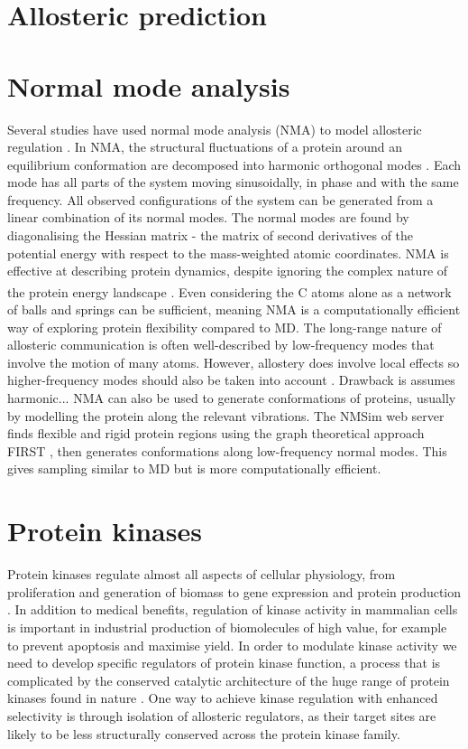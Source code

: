 \section{Allosteric prediction}


\section{Normal mode analysis}

Several studies have used normal mode analysis (NMA) to model allosteric regulation \cite{Mitternacht2011, Panjkovich2012, Balabin2009, Rodgers2013, Zheng2007}.
In NMA, the structural fluctuations of a protein around an equilibrium conformation are decomposed into harmonic orthogonal modes \cite{Hayward2008}.
Each mode has all parts of the system moving sinusoidally, in phase and with the same frequency.
All observed configurations of the system can be generated from a linear combination of its normal modes.
The normal modes are found by diagonalising the Hessian matrix - the matrix of second derivatives of the potential energy with respect to the mass-weighted atomic coordinates.
NMA is effective at describing protein dynamics, despite ignoring the complex nature of the protein energy landscape \cite{Bahar2005}.
Even considering the C\textsuperscript{\textalpha} atoms alone as a network of balls and springs can be sufficient, meaning NMA is a computationally efficient way of exploring protein flexibility compared to MD.
The long-range nature of allosteric communication is often well-described by low-frequency modes that involve the motion of many atoms.
However, allostery does involve local effects so higher-frequency modes should also be taken into account \cite{Collier2013}.
Drawback is assumes harmonic...
NMA can also be used to generate conformations of proteins, usually by modelling the protein along the relevant vibrations.
The NMSim web server \cite{Kruger2012, Ahmed2011} finds flexible and rigid protein regions using the graph theoretical approach FIRST \cite{Jacobs2001}, then generates conformations along low-frequency normal modes.
This gives sampling similar to MD but is more computationally efficient.


\section{Protein kinases}

Protein kinases regulate almost all aspects of cellular physiology, from proliferation and generation of biomass to gene expression and protein production \cite{Manning2002}.
In addition to medical benefits, regulation of kinase activity in mammalian cells is important in industrial production of biomolecules of high value, for example to prevent apoptosis and maximise yield.
In order to modulate kinase activity we need to develop specific regulators of protein kinase function, a process that is complicated by the conserved catalytic architecture of the huge range of protein kinases found in nature \cite{Muller2015}.
One way to achieve kinase regulation with enhanced selectivity is through isolation of allosteric regulators, as their target sites are likely to be less structurally conserved across the protein kinase family.

